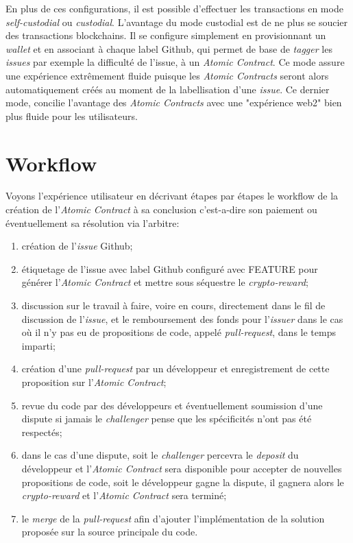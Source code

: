 \documentclass[
	a4paper, %
	10pt, %
	unnumberedsections, %
	twoside, %
]{LTJournalArticle}
\begin{document}
En plus de ces configurations, il est possible d'effectuer les transactions en mode \emph{self-custodial} ou \emph{custodial}. L'avantage du mode custodial est de ne plus se soucier des transactions blockchains. Il se configure simplement en provisionnant un \emph{wallet} et en associant à chaque label Github, qui permet de base de \emph{tagger} les \emph{issues} par exemple la difficulté de l'issue, à un \emph{Atomic Contract}. Ce mode assure une expérience extrêmement fluide puisque les \emph{Atomic Contracts} seront alors automatiquement créés au moment de la labellisation d'une \emph{issue}. Ce dernier mode, concilie l'avantage des \emph{Atomic Contracts} avec une "expérience web2" bien plus fluide pour les utilisateurs.


\section{Workflow}

Voyons l'expérience utilisateur en décrivant étapes par étapes le workflow de la création de l'\emph{Atomic Contract} à sa conclusion c'est-a-dire son paiement ou éventuellement sa résolution via l'arbitre:

\begin{enumerate}
\def\labelenumi{\arabic{enumi}.}
\item
  création de l'\emph{issue} Github;
\item
  étiquetage de l'issue avec label Github configuré avec FEATURE pour générer l'\emph{Atomic Contract} et mettre sous séquestre le \emph{crypto-reward};
\item
  discussion sur le travail à faire, voire en cours, directement dans le fil de discussion de l'\emph{issue}, et le remboursement des fonds pour l'\emph{issuer} dans le cas où il n'y pas eu de propositions de code, appelé \emph{pull-request}, dans le temps imparti;
\item
  création d'une \emph{pull-request} par un développeur et enregistrement de cette proposition sur l'\emph{Atomic Contract};
\item
  revue du code par des développeurs et éventuellement soumission d'une dispute si jamais le \emph{challenger} pense que les spécificités n'ont pas été respectés;
\item
  dans le cas d'une dispute, soit le \emph{challenger} percevra le \emph{deposit} du développeur et l'\emph{Atomic Contract} sera disponible pour accepter de nouvelles propositions de code, soit le développeur gagne la dispute, il gagnera alors le \emph{crypto-reward} et l'\emph{Atomic Contract} sera terminé;
\item
  le \emph{merge} de la \emph{pull-request} afin d'ajouter l'implémentation de la solution proposée sur la source principale du code.
\end{enumerate}
\end{document}
